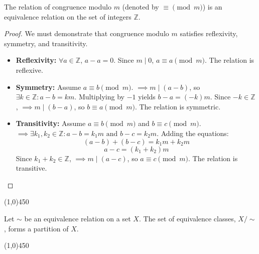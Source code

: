 \begin{theorem}
The relation of congruence modulo $m$ (denoted by $\equiv \pmod{m}$) is an equivalence relation on the set of integers $\mathbb{Z}$.
\end{theorem}
\begin{proof}
We must demonstrate that congruence modulo $m$ satisfies reflexivity, symmetry, and transitivity.
\begin{itemize}
    \item \textbf{Reflexivity:} $\forall a \in \mathbb{Z}$, $a - a = 0$. Since $m \mid 0$, $a \equiv a \pmod{m}$. The relation is reflexive.
    \item \textbf{Symmetry:} Assume $a \equiv b \pmod{m}$. $\implies m \mid (a - b)$, so $\exists k \in \mathbb{Z} : a - b = k m$.
    Multiplying by $-1$ yields $b - a = (-k) m$. Since $-k \in \mathbb{Z}$, $\implies m \mid (b - a)$, so $b \equiv a \pmod{m}$. The relation is symmetric.
    \item \textbf{Transitivity:} Assume $a \equiv b \pmod{m}$ and $b \equiv c \pmod{m}$.
    $\implies \exists k_1, k_2 \in \mathbb{Z} : a - b = k_1 m \text{ and } b - c = k_2 m$.
    Adding the equations:
    $$ (a - b) + (b - c) = k_1 m + k_2 m $$
    $$ a - c = (k_1 + k_2) m $$
    Since $k_1 + k_2 \in \mathbb{Z}$, $\implies m \mid (a - c)$, so $a \equiv c \pmod{m}$. The relation is transitive. \qedhere
\end{itemize}
\end{proof}

\begin{center}
    \line(1,0){450}
\end{center}

\begin{proposition}
Let $\sim$ be an equivalence relation on a set $X$. The set of equivalence classes, $X/\sim$, forms a partition of $X$.
\end{proposition}

\begin{center}
    \line(1,0){450}
\end{center}